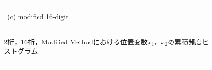 \documentclass[../main/main]{subfiles}
\begin{document}
\begin{description}
\begin{figure}[htbp]
\begin{tabular}{ccc}
\begin{minipage}{0.333\hsize}
\begin{center}
{\footnotesize (c) modified 16-digit}
\end{center}
\end{minipage}
\end{tabular}
\caption{2桁，16桁，Modified Methodにおける位置変数$x_1$，$x_2$の累積頻度ヒストグラム}%
\label{fig:hist}
\end{figure}
%
%
%
%
\begin{figure}[htbp]
\begin{tabular}{cc}
\begin{minipage}{0.32\hsize}

\end{minipage}
\end{tabular}
\end{figure}
\end{description}
\end{document}
